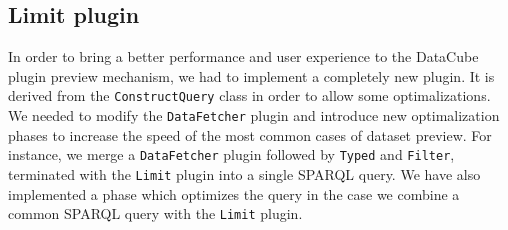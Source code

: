 \subsection{Limit plugin}
In order to bring a better performance and user experience to the DataCube plugin
preview mechanism, we had to implement a completely new plugin. It is derived 
from the \texttt{ConstructQuery} class in order to allow some optimalizations. 
We needed to modify the \texttt{DataFetcher} plugin and introduce new 
optimalization phases to increase the speed of the most common cases of dataset 
preview. For instance, we merge a \texttt{DataFetcher} plugin followed by 
\texttt{Typed} and \texttt{Filter}, terminated with the \texttt{Limit} plugin 
into a single SPARQL query. We have also implemented a phase which optimizes
the query in the case we combine a common SPARQL query with the \texttt{Limit} plugin.
